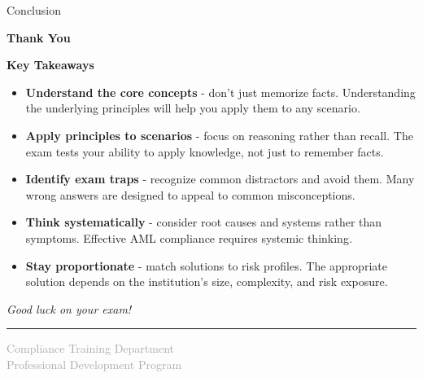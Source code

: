 \documentclass[8pt]{beamer}  %
\newcommand{\info}{\textcolor{infoblue}{\ding{42}}}
\begin{document}
	\begin{frame}{Conclusion}
		\begin{center}
			\Huge \textbf{Thank You}
		\end{center}
		
		\vspace{0.5cm}
		\begin{block}{\large \textbf{Key Takeaways}}
			\begin{itemize}
				\item \info \textbf{Understand the core concepts} - don't just memorize facts. Understanding the underlying principles will help you apply them to any scenario.
				
				\item \info \textbf{Apply principles to scenarios} - focus on reasoning rather than recall. The exam tests your ability to apply knowledge, not just to remember facts.
				
				\item \info \textbf{Identify exam traps} - recognize common distractors and avoid them. Many wrong answers are designed to appeal to common misconceptions.
				
				\item \info \textbf{Think systematically} - consider root causes and systems rather than symptoms. Effective AML compliance requires systemic thinking.
				
				\item \info \textbf{Stay proportionate} - match solutions to risk profiles. The appropriate solution depends on the institution's size, complexity, and risk exposure.
			\end{itemize}
		\end{block}
		
		\vspace{0.3cm}
		\begin{center}
			\large \textit{Good luck on your exam!}
			\vspace{0.2cm}
			
			\rule{6cm}{1pt}
			\vspace{0.2cm}
			
			\textcolor{darkgray}{Compliance Training Department} \\
			\textcolor{darkgray}{Professional Development Program}
		\end{center}
	\end{frame}
	
	
\end{document}
